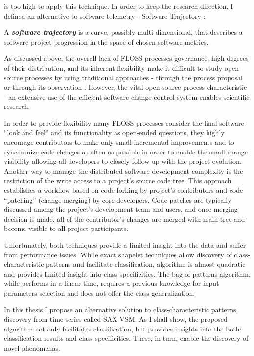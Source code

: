 is too high to apply this technique. 
In order to keep the research direction, I defined an alternative to software telemetry - Software Trajectory \cite{csdl2-10-09}:
\begin{defn}\label{def_trajectory}
A \textbf{\textit{software trajectory}} is a curve, possibly multi-dimensional, that describes a software project 
progression in the space of chosen software metrics.
\end{defn}

As discussed above, the overall lack of FLOSS processes governance, high degrees of their distribution, and its inherent flexibility make 
it difficult to study open-source processes by using traditional approaches - through the process proposal or through 
its observation \cite{citeulike:12550640} \cite{citeulike:10377366}.
However, the vital open-source process characteristic - an extensive use of the efficient software change control 
system enables scientific research. 

In order to provide flexibility many FLOSS processes consider the final software ``look and feel'' and its functionality 
as open-ended questions, they highly encourage contributors to make only small incremental 
improvements and to synchronize code changes as often as possible \cite{so-checkin} \cite{git-best-practices1}
in order to enable the small change visibility allowing all developers to closely follow up with the project evolution.
Another way to manage the distributed software development complexity is the restriction of the write access to 
a project's source code tree. This approach establishes a workflow based on code forking by project's contributors 
and code ``patching'' (change merging) by core developers. Code patches are typically discussed among the project's
development team and users, and once merging decision is made, all of the contributor's changes are merged 
with main tree and become visible to all project participants.


Unfortunately, both techniques provide a limited insight into the data and suffer from performance issues. 
While exact shapelet techniques allow discovery of class-characteristic patterns and facilitate classification,
algorithm is almost quadratic and provides limited insight into class specificities. 
The bag of patterns algorithm, while performs in a linear time, requires a previous knowledge for input parameters 
selection and does not offer the class generalization.

In this thesis I propose an alternative solution to class-characteristic patterns discovery from time series called 
SAX-VSM. As I shall show, the proposed algorithm not only facilitates classification, but provides insights into 
the both: classification results and class specificities. These, in turn, enable the discovery of novel phenomenas.

